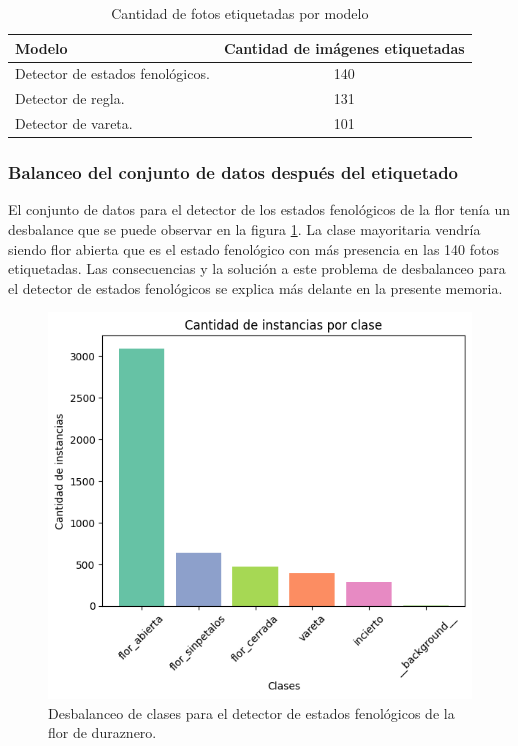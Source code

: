\begin{table}[h]
	\centering
	\caption{Cantidad de fotos etiquetadas por modelo}
	\begin{tabular}{l c }    
		\toprule
		\textbf{Modelo}     & \textbf{Cantidad de imágenes etiquetadas} \\
		\midrule
		Detector de estados fenológicos.                  & 140 \\
		Detector de regla.                  & 131 \\
		Detector de vareta.                  & 101 \\		
		\bottomrule
		\hline
	\end{tabular}
	\label{tab:etiquetado}
\end{table}

\subsubsection{Balanceo del conjunto de datos después del etiquetado}

El conjunto de datos para el detector de los estados fenológicos de la flor tenía un desbalance que se puede observar en la figura \ref{fig:desbalanceoDeteccion}. La clase mayoritaria vendría siendo flor abierta que es el estado fenológico con más presencia en las 140 fotos etiquetadas. Las consecuencias y la solución a este problema de desbalanceo para el detector de estados fenológicos se explica más delante en la presente memoria.

\begin{figure}[ht]
	\centering
	\includegraphics[scale=.65]{./Figures/desbalanceo_detector.png}
	\caption{Desbalanceo de clases para el detector de estados fenológicos de la flor de duraznero.}
	\label{fig:desbalanceoDeteccion}
\end{figure}
\newpage

